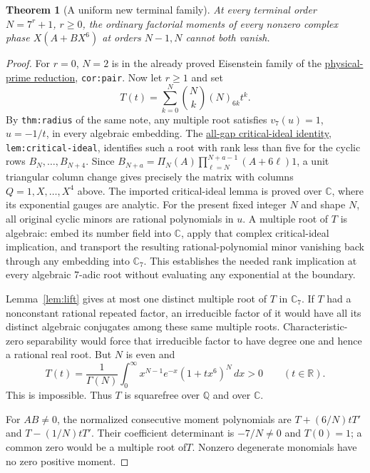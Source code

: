\documentclass[11pt]{article}
\newtheorem{theorem}[lemma]{Theorem}
\begin{document}
\begin{theorem}[A uniform new terminal family]\label{thm:family}
At every terminal order $N=7^r+1$, $r\ge0$, the ordinary factorial
moments of every nonzero complex phase $X(A+BX^6)$ at orders
$N-1,N$ cannot both vanish.
\end{theorem}
\begin{proof}
For $r=0$, $N=2$ is in the already proved Eisenstein family
of the \href{PHYSICAL_PRIME_TOTAL_DEGREE_REDUCTION.tex}{physical-prime reduction},
\texttt{cor:pair}. Now let $r\ge1$ and set
\[
 T(t)=\sum_{k=0}^N\binom Nk(N)_{6k}t^k.
\]
By \texttt{thm:radius} of the same note, any multiple root
satisfies $v_7(u)=1$, $u=-1/t$, in every algebraic embedding.
The \href{gap_three_hurwitz_structure.tex}{all-gap critical-ideal identity},
\texttt{lem:critical-ideal}, identifies such a root with rank
less than five for the cyclic rows $B_N,\ldots,B_{N+4}$.
Since $B_{N+a}=\Pi_N(A)\prod_{\ell=N}^{N+a-1}(A+6\ell)1$,
a unit triangular column change gives precisely the matrix
with columns $Q=1,X,\ldots,X^4$ above.
The imported critical-ideal lemma is proved over $\mathbb C$,
where its exponential gauges are analytic.
For the present fixed integer $N$ and shape $N$, all original
cyclic minors are rational polynomials in $u$.
A multiple root of $T$ is algebraic: embed its number field
into $\mathbb C$, apply that complex critical-ideal implication,
and transport the resulting rational-polynomial minor vanishing
back through any embedding into $\mathbb C_7$.
This establishes the needed rank implication at every algebraic
7-adic root without evaluating any exponential at the boundary.


Lemma~\ref{lem:lift} gives at most one distinct multiple root
of $T$ in $\mathbb C_7$.
If $T$ had a nonconstant rational repeated factor, an irreducible
factor of it would have all its distinct algebraic conjugates
among these same multiple roots. Characteristic-zero separability
would force that irreducible factor to have degree one and hence
a rational real root. But $N$ is even and
\[
 T(t)=\frac1{\Gamma(N)}\int_0^\infty
            x^{N-1}e^{-x}(1+tx^6)^N\,dx>0
 \qquad(t\in\mathbb R).
\]
This is impossible. Thus $T$ is squarefree over $\mathbb Q$
and over $\mathbb C$.

For $AB\ne0$, the normalized consecutive moment polynomials are
$T+(6/N)tT'$ and $T-(1/N)tT'$.
Their coefficient determinant is $-7/N\ne0$ and $T(0)=1$;
a common zero would be a multiple root of$T$.
Nonzero degenerate monomials have no zero positive moment.
\end{proof}
\end{document}
